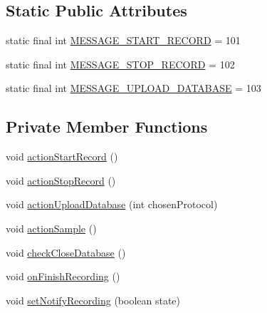 \subsection*{Static Public Attributes}
\begin{DoxyCompactItemize}
\item 
static final int \hyperlink{classcom_1_1qualoutdoor_1_1recorder_1_1recording_1_1RecordingHandler_abdd606dfb63915fc92f7e42c9332d7f8}{M\-E\-S\-S\-A\-G\-E\-\_\-\-S\-T\-A\-R\-T\-\_\-\-R\-E\-C\-O\-R\-D} = 101
\item 
static final int \hyperlink{classcom_1_1qualoutdoor_1_1recorder_1_1recording_1_1RecordingHandler_a6a4c48abcb8b3e837f706597c3e6e07d}{M\-E\-S\-S\-A\-G\-E\-\_\-\-S\-T\-O\-P\-\_\-\-R\-E\-C\-O\-R\-D} = 102
\item 
static final int \hyperlink{classcom_1_1qualoutdoor_1_1recorder_1_1recording_1_1RecordingHandler_a4a893d8da4a4d1f0811ca8b3fe5a1793}{M\-E\-S\-S\-A\-G\-E\-\_\-\-U\-P\-L\-O\-A\-D\-\_\-\-D\-A\-T\-A\-B\-A\-S\-E} = 103
\end{DoxyCompactItemize}
\subsection*{Private Member Functions}
\begin{DoxyCompactItemize}
\item 
void \hyperlink{classcom_1_1qualoutdoor_1_1recorder_1_1recording_1_1RecordingHandler_a7ad7623c7ecad92aab0db9be19c3fc49}{action\-Start\-Record} ()
\item 
void \hyperlink{classcom_1_1qualoutdoor_1_1recorder_1_1recording_1_1RecordingHandler_a79784f14dd9aab5fc8c38a165ece5842}{action\-Stop\-Record} ()
\item 
void \hyperlink{classcom_1_1qualoutdoor_1_1recorder_1_1recording_1_1RecordingHandler_a721d1a06f78dacaedec28b0e83799935}{action\-Upload\-Database} (int chosen\-Protocol)
\item 
void \hyperlink{classcom_1_1qualoutdoor_1_1recorder_1_1recording_1_1RecordingHandler_aeaf2519d789c0ddf0cd02d6d255d9e22}{action\-Sample} ()
\item 
void \hyperlink{classcom_1_1qualoutdoor_1_1recorder_1_1recording_1_1RecordingHandler_afdf5d85bb9c6cec87994bb8be28d7f7a}{check\-Close\-Database} ()
\item 
void \hyperlink{classcom_1_1qualoutdoor_1_1recorder_1_1recording_1_1RecordingHandler_a75abd8fed36cda7d3faa4a12169029cf}{on\-Finish\-Recording} ()
\item 
void \hyperlink{classcom_1_1qualoutdoor_1_1recorder_1_1recording_1_1RecordingHandler_a4c43ead95e4aa077e0a003e035aeb602}{set\-Notify\-Recording} (boolean state)
\end{DoxyCompactItemize}
